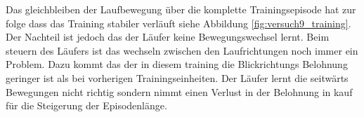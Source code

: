 Das gleichbleiben der Laufbewegung über die komplette Trainingsepisode hat zur folge dass das Training stabiler verläuft siehe Abbildung \ref{fig:versuch9_training}. Der Nachteil ist jedoch das der Läufer keine Bewegungswechsel lernt. Beim steuern des Läufers ist das wechseln zwischen den Laufrichtungen noch immer ein Problem. Dazu kommt das der in diesem training die Blickrichtungs Belohnung geringer ist als bei vorherigen Trainingseinheiten. Der Läufer lernt die seitwärts Bewegungen nicht richtig sondern nimmt einen Verlust in der Belohnung in kauf für die Steigerung der Episodenlänge.